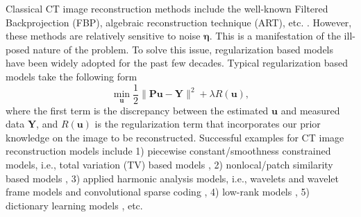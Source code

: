 \documentclass[journal,twoside]{IEEEtran}
\begin{document}
Classical CT image reconstruction methods include the well-known Filtered Backprojection (FBP), algebraic reconstruction technique (ART), etc. \cite{natterer2001mathematics}. However, these methods are relatively sensitive to noise $\bm{\eta}$. This is a manifestation of the ill-posed nature of the problem. To solve this issue, regularization based models have been widely adopted for the past few decades. Typical regularization based models take the following form \cite{aubert2006mathematical}
\begin{equation}\label{l2+g}
\min_{\bm{u}} \frac{1}{2}\|\bm{P}\bm{u}-\bm{Y}\|^{2}+\lambda R(\bm{u}),
\end{equation}
where the first term is the discrepancy between the estimated $\bm{u}$ and measured data $\bm{Y}$, and $R(\bm{u})$ is the regularization term that incorporates our prior knowledge on the image to be reconstructed. 
Successful examples for CT image reconstruction models include 1) piecewise constant/smoothness constrained models, i.e., total variation (TV) based models \cite{sidky2006accurate,sidky2008image,yang2010high,mahmood2018adaptive}, 2) nonlocal/patch similarity based models \cite{zeng2015spectral}, 3) applied harmonic analysis models, i.e., wavelets and wavelet frame models \cite{rantala2006wavelet,Dong2013,choi2016limited,zhang2018reweighted} and convolutional sparse coding \cite{bao2019convolutional}, 4) low-rank models \cite{gao2011robust,kim2014sparse,semerci2014tensor}, 5) dictionary learning models \cite{zhou2013adaptive,zhao2012dual,tai2016multiscale,zhan2016ct,zhang2016tensor,bai2017z,dong2018joint,kong2020spectral}, etc.
\end{document}
